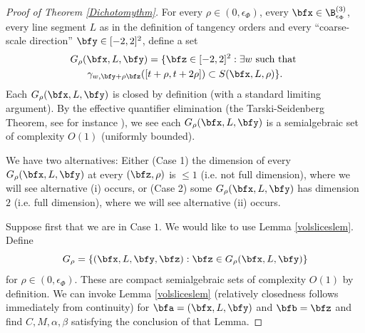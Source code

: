 \documentclass{article}
\numberwithin{equation}{section}
\theoremstyle{plain}
\begin{document}
\begin{proof}[Proof of Theorem \ref{Dichotomythm}]
    For every $\rho\in (0, \epsilon_{\Phi})$, every $\bfx\in \B^{(3)}_{\epsilon_{\Phi}}$, every line segment $L$ as in the definition of tangency orders and every ``coarse-scale direction'' $\bfy\in [-2, 2]^2$, define a set
    \begin{multline}
        G_{\rho}(\bfx, L, \bfy) = \{\bfz \in [-2, 2]^2: \exists  w \text{ such that }\\
         \gamma_{w, \bfy+ \rho \bfz}([t+\rho, t+2\rho])\subset S(\bfx, L, \rho)\}.
    \end{multline}
Each $G_{\rho}(\bfx, L, \bfy)$ is closed by definition (with a standard limiting argument). By the effective quantifier elimination (the Tarski-Seidenberg Theorem, see for instance \cite{basu2006algorithms}), we see  each $G_{\rho}(\bfx, L, \bfy)$ is a semialgebraic set of complexity $O(1)$ (uniformly bounded). 

We have two alternatives: Either (Case 1)  the dimension of every $G_{\rho}(\bfx, L, \bfy)$ at every $(\bfz, \rho)$  is $\leq 1$ (i.e. not full dimension), where we will see alternative (i) occurs, or (Case 2) some $G_{\rho}(\bfx, L, \bfy)$ has dimension $2$ (i.e. full dimension), where we will see alternative (ii) occurs. 

Suppose first that we are in Case $1$. We would like to use Lemma \ref{volsliceslem}. %
Define
\begin{equation}
    G_{\rho} = \{(\bfx, L, \bfy, \bfz): \bfz \in G_{\rho} (\bfx, L, \bfy)\}
\end{equation}
for $\rho\in (0, \epsilon_{\Phi})$. These are compact semialgebraic sets of complexity $O(1)$ by definition.  We can invoke Lemma \ref{volsliceslem} (relatively closedness follows immediately from continuity) for $\bfa = (\bfx, L, \bfy)$ and $\bfb=\bfz$ and find $C, M, \alpha, \beta$ satisfying the conclusion of that Lemma.


\end{proof}
\end{document}
